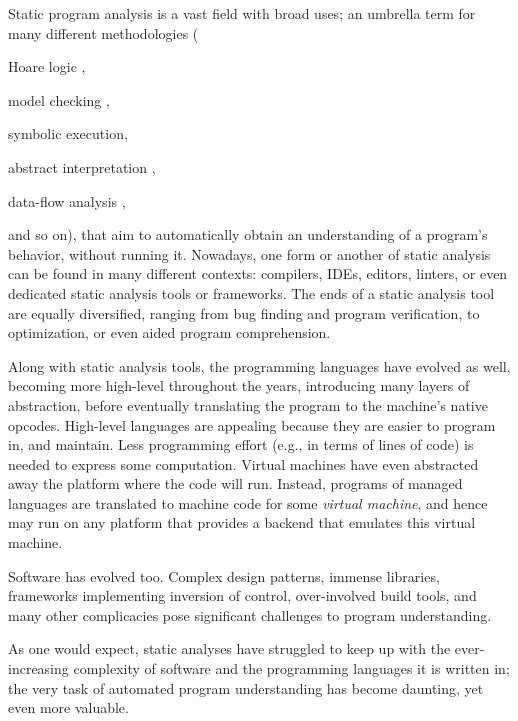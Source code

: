Static program analysis is a vast field with broad uses; an umbrella
term for many different methodologies (%
\begin{inparablank}
  \item Hoare logic
    \cite{journals/cacm/Hoare69,floyd1967assigning,lics:2002/Reynolds,csl/OHearnRY01},
  \item model checking
    \cite{icalp/EmersonC80,lop/ClarkeE81,toplas/ClarkeES86,programm/QueilleS82},
  \item symbolic execution,
  \item abstract interpretation
    \cite{popl/CousotC77,journals/jlp/CousotC92,journals/logcom/CousotC92},
  \item data-flow analysis
    \cite{popl/Kildall73,books/daglib/0030999,books/mk/Muchnick1997,journals/acta/KamU77,popl/RepsHS95,books/ph/SharirP81},
\end{inparablank}
and so on), that aim to automatically obtain an
understanding of a program's behavior, without running it. Nowadays,
one form or another of static analysis can be found in many different
contexts: compilers, IDEs, editors, linters, or even dedicated static
analysis tools or frameworks. The ends of a static analysis tool are
equally diversified, ranging from bug finding and program
verification, to optimization, or even aided program comprehension.

Along with static analysis tools, the programming languages have
evolved as well, becoming more high-level throughout the years,
introducing many layers of abstraction, before eventually translating
the program to the machine's native opcodes. High-level languages are
appealing because they are easier to program in, and maintain. Less
programming effort (e.g., in terms of lines of code) is needed to
express some computation. Virtual machines have even abstracted away
the platform where the code will run. Instead, programs of managed
languages are translated to machine code for some \emph{virtual
  machine}, and hence may run on any platform that provides a backend
that emulates this virtual machine.

Software has evolved too. Complex design patterns, immense libraries,
frameworks implementing inversion of control, over-involved build
tools, and many other complicacies pose significant challenges to
program understanding.

As one would expect, static analyses have struggled to keep up with
the ever-increasing complexity of software and the programming
languages it is written in; the very task of automated program
understanding has become daunting, yet even more valuable.

